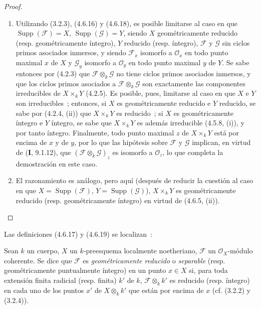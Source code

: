 \begin{proof}
\begin{enumerate}
\item[(i)] Utilizando (3.2.3), (4.6.16) y (4.6.18), es posible limitarse al caso
en que $\operatorname{Supp}(\mathscr F)=X$,
$\operatorname{Supp}(\mathscr G)=Y$, siendo $X$ geométricamente reducido
(resp. geométricamente íntegro), $Y$ reducido (resp. íntegro), $\mathscr F$ y
$\mathscr G$ sin ciclos primos asociados inmersos, y siendo $\mathscr F_x$
isomorfo a $\mathcal O_x$ en todo punto maximal $x$ de $X$ y $\mathscr G_y$
isomorfo a $\mathcal O_y$ en todo punto maximal $y$ de $Y$. Se sabe entonces
por (4.2.3) que $\mathscr F\otimes_k\mathscr G$ no tiene ciclos primos
asociados inmersos, y que los ciclos primos asociados a
$\mathscr F\otimes_k\mathscr G$ son exactamente las componentes irreducibles
de $X\times_k Y$ (4.2.5). Es posible, pues, limitarse al caso en que $X$ e $Y$
son irreducibles~; entonces, si $X$ es geométricamente reducido e $Y$ reducido,
se sabe por (4.2.4, (ii)) que $X\times_k Y$ es reducido~; si $X$ es
geométricamente íntegro e $Y$ íntegro, se sabe que $X\times_k Y$ es además
irreducible (4.5.8, (i)), y por tanto íntegro. Finalmente, todo punto maximal
$z$ de $X\times_k Y$ está por encima de $x$ y de $y$, por lo que las hipótesis
sobre $\mathscr F$ y $\mathscr G$ implican, en virtud de (\textbf I, 9.1.12), que
$(\mathscr F\otimes_k\mathscr G)_z$ es isomorfo a $\mathcal O_z$, lo que
completa la demostración en este caso.

\item[(ii)] El razonamiento es análogo, pero aquí (después de reducir la cuestión al
caso en que $X=\operatorname{Supp}(\mathscr F)$,
$Y=\operatorname{Supp}(\mathscr G)$), $X\times_k Y$ es geométricamente reducido
(resp. geométricamente íntegro) en virtud de (4.6.5, (ii)).
\end{enumerate}
\end{proof}

Las definiciones (4.6.17) y (4.6.19) se localizan~:

\begin{definition}[4.6.22]
\label{IV.2.4.6.22-fr}
Sean $k$ un cuerpo, $X$ un $k$-preesquema localmente noetheriano, $\mathscr F$
un $\mathcal O_X$-módulo coherente. Se dice que $\mathscr F$ es
\emph{geométricamente reducido} o \emph{separable} \textup{(resp. geométricamente
puntualmente íntegro)} en un punto $x\in X$ si, para toda extensión finita
radicial \textup{(resp.} finita) $k'$ de $k$, $\mathscr F\otimes_k k'$ es reducido
\textup{(resp.} íntegro) en cada uno de los puntos $x'$ de $X\otimes_k k'$ que están
por encima de $x$ \textup{(cf. (3.2.2) y (3.2.4))}.
\end{definition}

